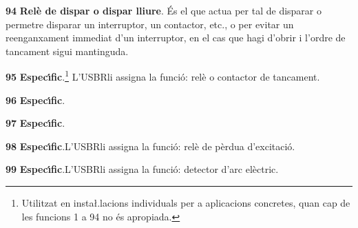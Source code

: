 \begin{multicols}{2}
\begin{list}{}
\item[\textbf{94}]  \textbf{Rel\`{e} de dispar o dispar
lliure}. \'{E}s el que actua per tal de disparar o permetre disparar un
interruptor, un contactor, etc., o per evitar un reenganxament
immediat d'un interruptor, en el cas que hagi d'obrir i l'ordre de
tancament sigui mantinguda.

\item[\textbf{95}] \textbf{Espec\'{\i}fic}.\footnote{Utilitzat en insta{\l.l}acions
individuals per a aplicacions concretes, quan cap de les funcions 1
a 94 no \'{e}s apropiada.} L'\textsf{USBR}\footnotemark[1] li assigna la
funci\'{o}: rel\`{e} o contactor de tancament.

\item[\textbf{96}] \textbf{Espec\'{\i}fic}.\footnotemark[2]

\item[\textbf{97}] \textbf{Espec\'{\i}fic}.\footnotemark[2]

\item[\textbf{98}] \textbf{Espec\'{\i}fic}.\footnotemark[2] L'\textsf{USBR}\footnotemark[1] li assigna la
funci\'{o}: rel\`{e} de p\`{e}rdua d'excitaci\'{o}.

\item[\textbf{99}] \textbf{Espec\'{\i}fic}.\footnotemark[2] L'\textsf{USBR}\footnotemark[1] li assigna la
funci\'{o}: detector d'arc el\`{e}ctric.

\end{list}
\end{multicols}
